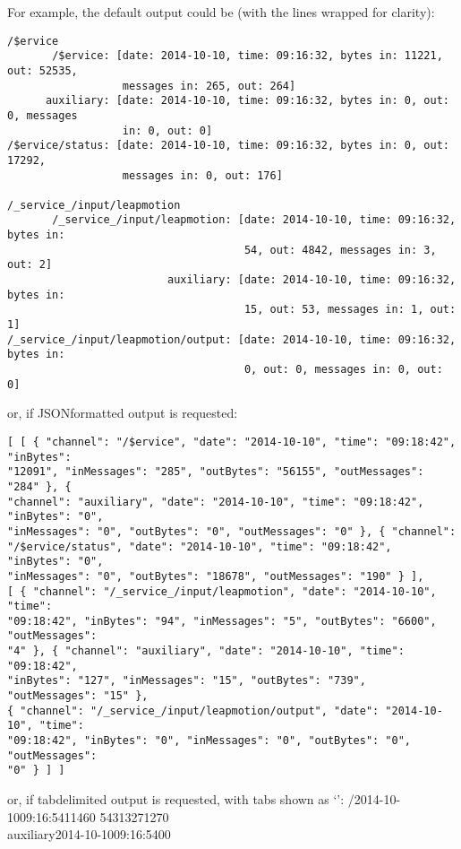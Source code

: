 For example, the default output could be (with the lines wrapped for clarity):
\outputBegin{}
\begin{verbatim}
/$ervice
       /$ervice: [date: 2014-10-10, time: 09:16:32, bytes in: 11221, out: 52535,
                  messages in: 265, out: 264]
      auxiliary: [date: 2014-10-10, time: 09:16:32, bytes in: 0, out: 0, messages
                  in: 0, out: 0]
/$ervice/status: [date: 2014-10-10, time: 09:16:32, bytes in: 0, out: 17292,
                  messages in: 0, out: 176]

/_service_/input/leapmotion
       /_service_/input/leapmotion: [date: 2014-10-10, time: 09:16:32, bytes in:
                                     54, out: 4842, messages in: 3, out: 2]
                         auxiliary: [date: 2014-10-10, time: 09:16:32, bytes in:
                                     15, out: 53, messages in: 1, out: 1]
/_service_/input/leapmotion/output: [date: 2014-10-10, time: 09:16:32, bytes in:
                                     0, out: 0, messages in: 0, out: 0]
\end{verbatim}
\outputEnd{}
or, if JSON\longDash{}formatted output is requested:
\outputBegin{}
\begin{verbatim}
[ [ { "channel": "/$ervice", "date": "2014-10-10", "time": "09:18:42", "inBytes":
"12091", "inMessages": "285", "outBytes": "56155", "outMessages": "284" }, {
"channel": "auxiliary", "date": "2014-10-10", "time": "09:18:42", "inBytes": "0",
"inMessages": "0", "outBytes": "0", "outMessages": "0" }, { "channel":
"/$ervice/status", "date": "2014-10-10", "time": "09:18:42", "inBytes": "0",
"inMessages": "0", "outBytes": "18678", "outMessages": "190" } ],
[ { "channel": "/_service_/input/leapmotion", "date": "2014-10-10", "time":
"09:18:42", "inBytes": "94", "inMessages": "5", "outBytes": "6600", "outMessages":
"4" }, { "channel": "auxiliary", "date": "2014-10-10", "time": "09:18:42",
"inBytes": "127", "inMessages": "15", "outBytes": "739", "outMessages": "15" },
{ "channel": "/_service_/input/leapmotion/output", "date": "2014-10-10", "time":
"09:18:42", "inBytes": "0", "inMessages": "0", "outBytes": "0", "outMessages":
"0" } ] ]
\end{verbatim}
\outputEnd{}
\condPage{}
or, if tab\longDash{}delimited output is requested, with tabs shown as `\tabSymbol':
\outputBegin{}
/\dollarService\pseudotab{}2014-10-10\pseudotab{}09:16:54\pseudotab{}11460%
\pseudotab{}54313\pseudotab{}271\pseudotab{}270\\
auxiliary\pseudotab{}2014-10-10\pseudotab{}09:16:54\pseudotab{}0\pseudotab{}0\pseudotab{}%

